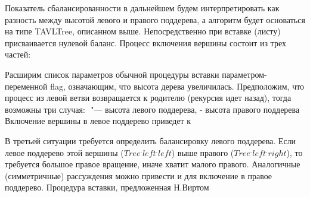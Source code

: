 Показатель сбалансированности в дальнейшем будем интерпретировать
как разность между высотой левого и правого поддерева,
а алгоритм будет основаться на типе TAVLTree, описанном выше.
Непосредственно при вставке (листу) присваивается нулевой баланс.
Процесс включения вершины состоит из трех частей:



Расширим список параметров обычной процедуры вставки параметром-переменной flag,
означающим, что высота дерева увеличилась.
Предположим, что процесс из левой ветви возвращается к родителю (рекурсия идет назад),
тогда возможны три случая:
{ $ $ "--- высота левого поддерева, $ $- высота правого поддерева }
Включение вершины в левое поддерево приведет к



В третьей ситуации требуется определить балансировку левого поддерева.
Если левое поддерево этой вершины ($Tree^.left^.left$) выше правого ($Tree^.left^.right$),
то требуется большое правое вращение, иначе хватит малого правого.
Аналогичные (симметричные) рассуждения можно привести и для включение в правое поддерево.
Процедура вставки, предложенная Н.Виртом


